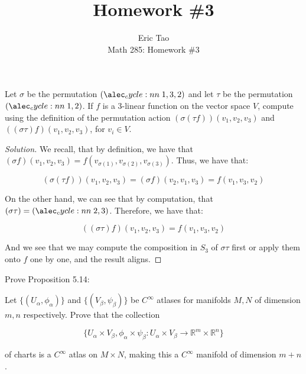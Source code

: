 \documentclass[10pt]{article}
\newenvironment{problem}[2][]{\begin{trivlist}
\item[\hskip \labelsep {\bfseries #1}\hskip \labelsep {\bfseries #2.}]}{\end{trivlist}}
\begin{document}
 
\title{Homework \#3}
\author{Eric Tao\\
Math 285: Homework \#3}
\maketitle

\begin{problem}{Question 1}

Let $\sigma$ be the permutation $\cycle{1,3,2}$ and let $\tau$ be the permutation $\cycle{1,2}$. If $f$ is a $3$-linear function on the vector space $V$, compute using the definition of the permutation action $(\sigma(\tau f))(v_1, v_2, v_3)$ and $((\sigma \tau)f)(v_1, v_2, v_3)$, for $v_i \in V$.

\end{problem}

\begin{proof}[Solution]

We recall, that by definition, we have that $(\sigma f)(v_1, v_2, v_3) = f(v_{\sigma(1)}, v_{\sigma(2)}, v_{\sigma(3)})$. Thus, we have that:

$$(\sigma(\tau f))(v_1, v_2, v_3) = (\sigma f) (v_2, v_1, v_3) = f(v_1, v_3, v_2)$$

On the other hand, we can see that by computation, that $(\sigma \tau) = \cycle{2,3}$. Therefore, we have that:

$$ ((\sigma \tau)f)(v_1, v_2, v_3) = f(v_1, v_3, v_2)$$

And we see that we may compute the composition in $S_3$ of $\sigma \tau$ first or apply them onto $f$ one by one, and the result aligns.

\end{proof}

\begin{problem}{Question 2}

Prove Proposition 5.14:

Let $\{ (U_\alpha, \phi_\alpha) \}$ and $\{ (V_\beta, \psi_\beta) \}$ be $C^\infty$ atlases for manifolds $M,N$ of dimension $m,n$ respectively. Prove that the collection

$$ \{ U_\alpha \times V_\beta, \phi_\alpha \times \psi_\beta: U_\alpha \times V_\beta \to \mathbb{R}^m \times \mathbb{R}^n \}$$

of charts is a $C^\infty$ atlas on $M \times N$, making this a $C^\infty$ manifold of dimension $m+n$.

\end{problem}
\end{document}
